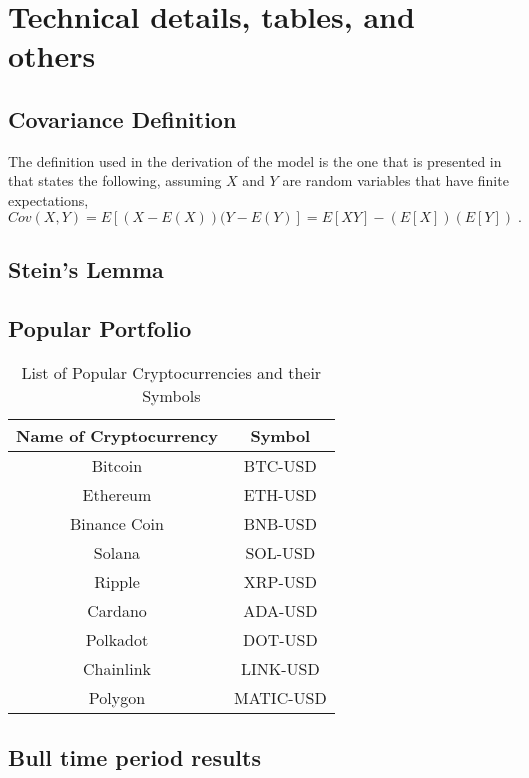 
\chapter{Technical details, tables, and others}
\label{app_a}

\section{Covariance Definition}
\label{app: cov-def}
The definition used in the derivation of the model is the one that is presented in \parencite{Intro-prob-roussas} that states the following, assuming $X$ and $Y$ are random variables that have finite expectations,
\begin{equation}
	Cov(X,Y) = E\left[(X-E(X))(Y-E(Y)\right] = E\left[XY\right] - (E\left[X\right])(E\left[Y\right])\;.
\end{equation}

\section{Stein's Lemma}
\label{app: steins lemma}

\section{Popular Portfolio}
\begin{table}[h!]
	\centering
	\begin{tabular}{|c|c|}
		\hline
		\textbf{Name of Cryptocurrency} & \textbf{Symbol} \\ \hline
		Bitcoin & BTC-USD \\ \hline
		Ethereum & ETH-USD \\ \hline
		Binance Coin & BNB-USD \\ \hline
		Solana & SOL-USD \\ \hline
		Ripple & XRP-USD \\ \hline
		Cardano & ADA-USD \\ \hline
		Polkadot & DOT-USD \\ \hline
		Chainlink & LINK-USD \\ \hline
		Polygon & MATIC-USD \\ \hline
	\end{tabular}
	\caption{List of Popular Cryptocurrencies and their Symbols}
	\label{tab:cryptos}
\end{table}

\section{Bull time period results}
\label{app: bull-res}

